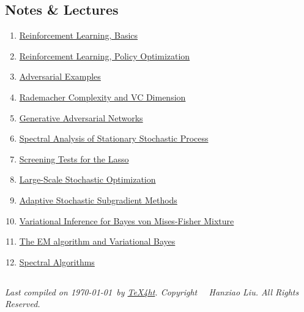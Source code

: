 \documentclass{article}
\begin{document}
\subsection*{Notes \& Lectures}
\begin{enumerate}
	\item \href{slides/rl.pdf}{Reinforcement Learning, Basics}
	\item \href{slides/rl-po.pdf}{Reinforcement Learning, Policy Optimization}
	\item \href{slides/adversarial.pdf}{Adversarial Examples}
	\item \href{slides/rademacher_vc_hanxiaol.pdf}{Rademacher Complexity and VC Dimension}
	\item \href{slides/gan.pdf}{Generative Adversarial Networks}
	\item \href{slides/sp.pdf}{Spectral Analysis of Stationary Stochastic Process}
	\item \href{slides/screening.pdf}{Screening Tests for the Lasso}
	\item \href{slides/hanxiaol-sgd.pdf}{Large-Scale Stochastic Optimization}
	\item \href{slides/hanxiaol-adagrad.pdf}{Adaptive Stochastic Subgradient Methods}
	\item \href{slides/hanxiaol-bvmf.pdf}{Variational Inference for Bayes von Mises-Fisher Mixture}
	\item \href{slides/hanxiaol-emvb.pdf}{The EM algorithm and Variational Bayes}
	\item \href{slides/spectral_learning.pdf}{Spectral Algorithms}
\end{enumerate}


\subsection*{}
\footnotesize{
    \textit{
        Last compiled on \today\ by \href{http://www.tug.org/tex4ht/}{\TeX4ht}. \newline
        Copyright \textcopyright\ \the\year\ Hanxiao Liu. All Rights Reserved.
    }
}
\end{document}

